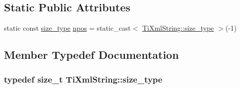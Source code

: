 \subsection*{Static Public Attributes}
\begin{DoxyCompactItemize}
\item 
static const \hyperlink{class_ti_xml_string_abeb2c1893a04c17904f7c06546d0b971}{size\-\_\-type} \hyperlink{class_ti_xml_string_a8f4422d227088dc7bec96f479b275d0a}{npos} = static\-\_\-cast$<$ \hyperlink{class_ti_xml_string_abeb2c1893a04c17904f7c06546d0b971}{Ti\-Xml\-String\-::size\-\_\-type} $>$(-\/1)
\end{DoxyCompactItemize}


\subsection{Member Typedef Documentation}
\hypertarget{class_ti_xml_string_abeb2c1893a04c17904f7c06546d0b971}{
\subsubsection[{size\-\_\-type}]{\setlength{\rightskip}{0pt plus 5cm}typedef size\-\_\-t {\bf Ti\-Xml\-String\-::size\-\_\-type}}}\label{class_ti_xml_string_abeb2c1893a04c17904f7c06546d0b971}


